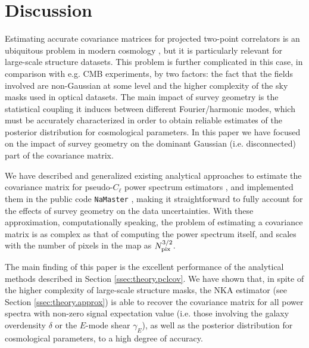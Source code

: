 \documentclass[a4paper,11pt]{article}
\begin{document}
  \section{Discussion}\label{sec:discussion}
    Estimating accurate covariance matrices for projected two-point correlators is an ubiquitous problem in modern cosmology \cite{2013PhRvD..88f3537D,2013MNRAS.432.1928T,2017arXiv170609359K}, but it is particularly relevant for large-scale structure datasets. This problem is further complicated in this case, in comparison with e.g. CMB experiments, by two factors: the fact that the fields involved are non-Gaussian at some level and the higher complexity of the sky masks used in optical datasets. The main impact of survey geometry is the statistical coupling it induces between different Fourier/harmonic modes, which must be accurately characterized in order to obtain reliable estimates of the posterior distribution for cosmological parameters. In this paper we have focused on the impact of survey geometry on the dominant Gaussian (i.e. disconnected) part of the covariance matrix.
    
    We have described and generalized existing analytical approaches to estimate the covariance matrix for pseudo-$C_\ell$ power spectrum estimators \cite{2004MNRAS.349..603E,2005MNRAS.360.1262B,2017A&A...602A..41C}, and implemented them in the public code {\tt NaMaster} \cite{2019MNRAS.484.4127A}, making it straightforward to fully account for the effects of survey geometry on the data uncertainties. With these approximation, computationally speaking, the problem of estimating a covariance matrix is as complex as that of computing the power spectrum itself, and scales with the number of pixels in the map as $N_{\rm pix}^{3/2}$.
    
    The main finding of this paper is the excellent performance of the analytical methods described in Section \ref{ssec:theory.pclcov}. We have shown that, in spite of the higher complexity of large-scale structure masks, the NKA estimator (see Section \ref{ssec:theory.approx}) is able to recover the covariance matrix for all power spectra with non-zero signal expectation value (i.e. those involving the galaxy overdensity $\delta$ or the $E$-mode shear $\gamma_E$), as well as the posterior distribution for cosmological parameters, to a high degree of accuracy.
\end{document}
